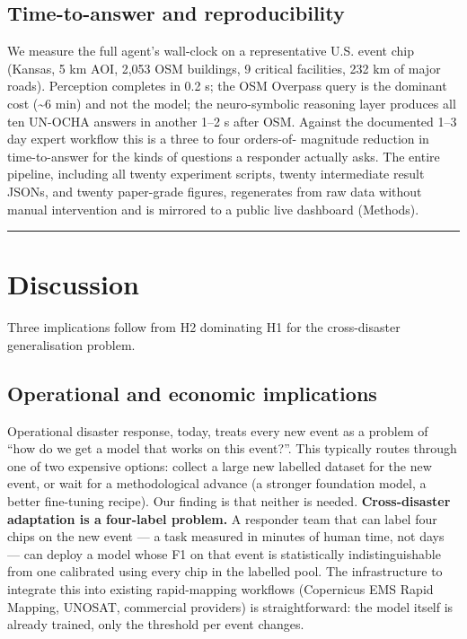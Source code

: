 \subsection{Time-to-answer and reproducibility}\label{time-to-answer-and-reproducibility}

We measure the full agent's wall-clock on a representative U.S. event chip
(Kansas, 5 km AOI, 2,053 OSM buildings, 9 critical facilities, 232 km of
major roads). Perception completes in 0.2 s; the OSM Overpass query is the
dominant cost (\textasciitilde6 min) and not the model; the neuro-symbolic reasoning layer
produces all ten UN-OCHA answers in another 1--2 s after OSM. Against the
documented 1--3 day expert workflow this is a three to four orders-of-
magnitude reduction in time-to-answer for the kinds of questions a responder
actually asks. The entire pipeline, including all twenty experiment scripts,
twenty intermediate result JSONs, and twenty paper-grade figures, regenerates
from raw data without manual intervention and is mirrored to a public live
dashboard (Methods).

\begin{center}\rule{0.5\linewidth}{0.5pt}\end{center}

\section{Discussion}\label{discussion}

Three implications follow from H2 dominating H1 for the cross-disaster
generalisation problem.

\subsection{Operational and economic implications}\label{operational-and-economic-implications}

Operational disaster response, today, treats every new event as a
problem of ``how do we get a model that works on this event?''. This
typically routes through one of two expensive options: collect a large
new labelled dataset for the new event, or wait for a methodological
advance (a stronger foundation model, a better fine-tuning recipe). Our
finding is that neither is needed. \textbf{Cross-disaster adaptation is a
four-label problem.} A responder team that can label four chips on the
new event --- a task measured in minutes of human time, not days --- can
deploy a model whose F1 on that event is statistically indistinguishable
from one calibrated using every chip in the labelled pool. The
infrastructure to integrate this into existing rapid-mapping workflows
(Copernicus EMS Rapid Mapping, UNOSAT, commercial providers) is
straightforward: the model itself is already trained, only the
threshold per event changes.

